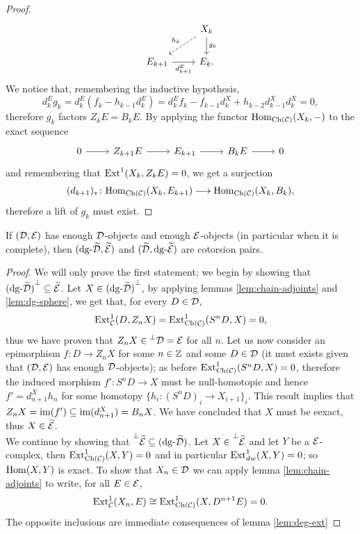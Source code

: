 \begin{proof}
    \[\begin{tikzcd}
        & {X_k} \\
        {E_{k+1}} & {E_k.}
        \arrow["{h_k}"', dashed, from=1-2, to=2-1]
        \arrow["{g_k}", from=1-2, to=2-2]
        \arrow["{d^E_{k+1}}"', from=2-1, to=2-2]
    \end{tikzcd}\]
    We notice that, remembering the inductive hypothesis,
    \[d_k^E g_k = d_k^E (f_k - h_{k-1}d_{k}^E) = d_k^E f_k - f_{k-1} d_k^X  + h_{k-2}d^X_{k-1}d^X_k = 0,\]
    therefore $g_k$ factors $Z_k E =B_k E$.
    By applying the functor $\mathrm{Hom}_{\mathrm{Ch}(\mathcal{C})}(X_k, {-})$ to the exact sequence\[\begin{tikzcd}
        0 & {Z_{k+1} E} & {E_{k+1}} & {B_{k} E} & {0}
        \arrow[from=1-1, to=1-2]
        \arrow[from=1-2, to=1-3]
        \arrow[from=1-3, to=1-4]
        \arrow[from=1-4, to=1-5]
    \end{tikzcd}\]
    and remembering that $\mathrm{Ext}^1(X_k, Z_k E) = 0$, we get a surjection
    \[(d_{k+1})_* \colon \mathrm{Hom}_{\mathrm{Ch}(\mathcal{C})}(X_k, E_{k+1}) \longrightarrow \mathrm{Hom}_{\mathrm{Ch}(\mathcal{C})}(X_k, B_{k}),\]
    therefore a lift of $g_k$ must exist.

\end{proof}


\begin{proposition}
    If $(\mathcal{D}, \mathcal{E})$ has enough $\mathcal{D}$-objects and enough $\mathcal{E}$-objects (in particular when it is complete), then $(\mathrm{dg} \text{-}\widetilde{\mathcal{D}}, \widetilde{\mathcal{E}})$ and $(\widetilde{\mathcal{D}}, \mathrm{dg} \text{-}\widetilde{\mathcal{E}})$ are cotorsion pairs. 
\end{proposition}

\begin{proof}
    We will only prove the first statement; we begin by showing that ${(\mathrm{dg} \text{-}\widetilde{\mathcal{D}})}^\perp \subseteq \widetilde{\mathcal{E}}$. Let $X \in {(\mathrm{dg} \text{-}\widetilde{\mathcal{D}})}^\perp$, by applying lemmas \ref{lem:chain-adjoints} and \ref{lem:dg-sphere}, we get that, for every $D \in \mathcal{D}$,
    \[\mathrm{Ext}^1_{\mathcal{C}}(D, Z_n X) = \mathrm{Ext}^1_{\mathrm{Ch}(\mathcal{C})}(S^n D, X) = 0,\]
    thus we have proven that $Z_n X \in \prescript{\perp}{}{\mathcal{D}} =\mathcal{E}$ for all $n$. Let us now consider an epimorphism $f \colon D \longrightarrow Z_n X$ for some $n \in \mathbb{Z}$ and some $D \in \mathcal{D}$ (it must exists given that $(\mathcal{D}, \mathcal{E})$ has enough $\mathcal{D}$-objects); as before $\mathrm{Ext}^1_{\mathrm{Ch}(\mathcal{C})}(S^n D, X) = 0$, therefore the induced morphism $f'\colon S^n D \longrightarrow X$ must be null-homotopic and hence $f' = d^X_{n+1} h_n$ for some homotopy $\{h_i \colon (S^n D)_i \longrightarrow X_{i+1}\}_i$. This result implies that $Z_nX = \operatorname{im}(f') \subseteq \operatorname{im}(d^X_{n+1}) = B_n X$. We have concluded that $X$ must be eexact, thus $X \in \widetilde{\mathcal{E}}$. \\
    We continue by showing that $\prescript{\perp}{}{\widetilde{\mathcal{E}}} \subseteq (\mathrm{dg} \text{-}\widetilde{\mathcal{D}})$. Let $X \in \prescript{\perp}{}{\widetilde{\mathcal{E}}}$ and let $Y$ be a $\mathcal{E}$-complex, then $\mathrm{Ext}^1_{\mathrm{Ch}(\mathcal{C})}(X,Y) = 0$ and in particular $\mathrm{Ext}^1_{dw}(X,Y) = 0$; so $\mathrm{Hom}(X,Y)$ is exact. To show that $X_n \in \mathcal{D}$ we can apply lemma \ref{lem:chain-adjoints} to write, for all $E\in \mathcal{E}$,
    \[\mathrm{Ext}^1_{\mathcal{C}}(X_n, E) \cong \mathrm{Ext}^1_{\mathrm{Ch}(\mathcal{C})}(X,D^{n+1}E) = 0.\]
    The opposite inclusions are immediate consequences of lemma \ref{lem:deg-ext}
\end{proof}



